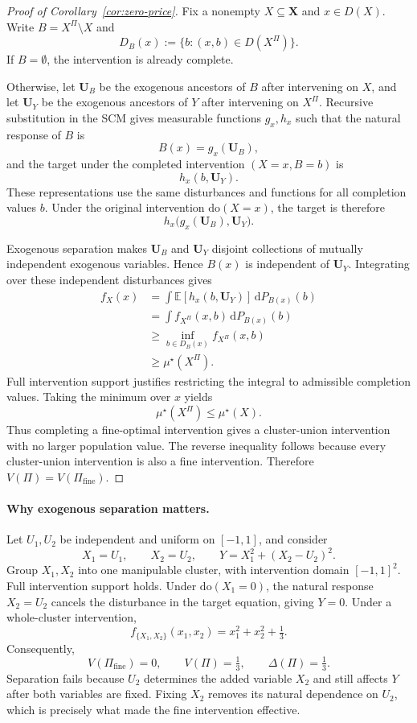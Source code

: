 \documentclass[twoside]{article}
\newcommand{\E}{\mathbb{E}}
\newcommand{\doo}{\mathrm{do}}
\begin{document}
\begin{proof}[Proof of Corollary~\ref{cor:zero-price}]
Fix a nonempty \(X\subseteq\mathbf X\) and \(x\in D(X)\).
Write \(B=X^\Pi\setminus X\) and
\[
D_B(x):=\{b:(x,b)\in D(X^\Pi)\}.
\]
If \(B=\emptyset\), the intervention is already complete.

Otherwise, let \(\mathbf U_B\) be the exogenous ancestors of \(B\)
after intervening on \(X\), and let \(\mathbf U_Y\) be the
exogenous ancestors of \(Y\) after intervening on \(X^\Pi\).
Recursive substitution in the SCM gives measurable functions
\(g_x,h_x\) such that the natural response of \(B\) is
\[
B(x)=g_x(\mathbf U_B),
\]
and the target under the completed intervention \((X=x,B=b)\) is
\[
h_x(b,\mathbf U_Y).
\]
These representations use the same disturbances and functions for
all completion values \(b\). Under the original intervention
\(\doo(X=x)\), the target is therefore
\[
h_x\bigl(g_x(\mathbf U_B),\mathbf U_Y\bigr).
\]

Exogenous separation makes \(\mathbf U_B\) and \(\mathbf U_Y\)
disjoint collections of mutually independent exogenous variables.
Hence \(B(x)\) is independent of \(\mathbf U_Y\).
Integrating over these independent disturbances gives
\[
\begin{aligned}
f_X(x)
&=\int \E\!\left[h_x(b,\mathbf U_Y)\right]\,
        \mathrm dP_{B(x)}(b)\\
&=\int f_{X^\Pi}(x,b)\,\mathrm dP_{B(x)}(b)\\
&\ge \inf_{b\in D_B(x)} f_{X^\Pi}(x,b)\\
&\ge \mu^\star(X^\Pi).
\end{aligned}
\]
Full intervention support justifies restricting the integral to
admissible completion values. Taking the minimum over \(x\) yields
\[
\mu^\star(X^\Pi)\le\mu^\star(X).
\]
Thus completing a fine-optimal intervention gives a cluster-union
intervention with no larger population value. The reverse inequality
follows because every cluster-union intervention is also a fine
intervention. Therefore \(V(\Pi)=V(\Pi_{\mathrm{fine}})\).
\end{proof}

\paragraph{Why exogenous separation matters.}
Let \(U_1,U_2\) be independent and uniform on \([-1,1]\), and consider
\[
X_1=U_1,\qquad
X_2=U_2,\qquad
Y=X_1^2+(X_2-U_2)^2.
\]
Group \(X_1,X_2\) into one manipulable cluster, with intervention
domain \([-1,1]^2\). Full intervention support holds.
Under \(\doo(X_1=0)\), the natural response \(X_2=U_2\) cancels
the disturbance in the target equation, giving \(Y=0\).
Under a whole-cluster intervention,
\[
f_{\{X_1,X_2\}}(x_1,x_2)
=x_1^2+x_2^2+\tfrac13.
\]
Consequently,
\[
V(\Pi_{\mathrm{fine}})=0,\qquad
V(\Pi)=\tfrac13,\qquad
\Delta(\Pi)=\tfrac13.
\]
Separation fails because \(U_2\) determines the added variable
\(X_2\) and still affects \(Y\) after both variables are fixed.
Fixing \(X_2\) removes its natural dependence on \(U_2\), which is
precisely what made the fine intervention effective.
\end{document}
